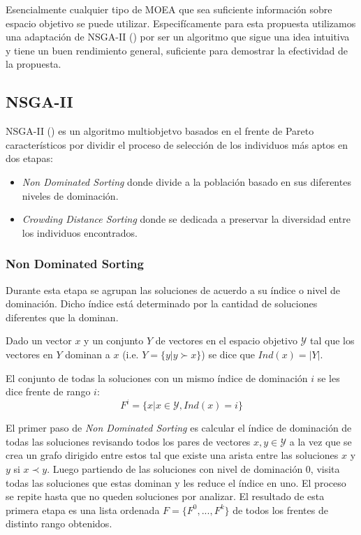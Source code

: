 Esencialmente cualquier tipo de MOEA que sea suficiente informaci\'on sobre espacio objetivo se puede utilizar. Especif\'icamente para esta propuesta utilizamos una adaptaci\'on de NSGA-II (\cite{deb2002fast}) por ser un algoritmo que sigue una idea intuitiva y tiene un buen rendimiento general, suficiente para demostrar la efectividad de la propuesta.

\subsection{NSGA-II}
NSGA-II (\cite{deb2002fast}) es un algoritmo multiobjetvo basados en el frente de Pareto caracter\'isticos por dividir el proceso de selecci\'on de los individuos m\'as aptos en dos etapas:
\begin{itemize}
    \item \textit{Non Dominated Sorting} donde divide a la poblaci\'on basado en sus diferentes niveles de dominaci\'on.
    \item \textit{Crowding Distance Sorting} donde se dedicada a preservar la diversidad entre los individuos encontrados. 
\end{itemize}


\subsubsection{Non Dominated Sorting}
Durante esta etapa se agrupan las soluciones de acuerdo a su \'indice o nivel de dominaci\'on. Dicho \'indice est\'a  determinado por la cantidad de soluciones diferentes que la dominan.

\begin{definition}
    \label{proposal:def:domination_index}
    Dado un vector $x$ y un conjunto $Y$ de vectores en el espacio objetivo $\mathcal{Y}$ tal que los vectores en $Y$ dominan a $x$ (i.e. $Y = \{y | y \succ x\}$) se dice que $Ind(x) = |Y|$.
\end{definition}

\begin{definition}
    \label{proposal:def:rank_front}
    El conjunto de todas la soluciones con un mismo \'indice de dominaci\'on $i$ se les dice frente de rango $i$:
    \begin{equation*}
         F^i = \{x | x \in \mathcal{Y}, Ind(x) = i\}
    \end{equation*}
\end{definition}

El primer paso de \textit{Non Dominated Sorting} es calcular el \'indice de dominaci\'on de todas las soluciones revisando todos los pares de vectores $x, y \in \mathcal{Y}$ a la vez que se crea un grafo dirigido entre estos tal que existe una arista entre las soluciones $x$ y $y$ si $x \prec y$. Luego partiendo de las soluciones con nivel de dominaci\'on 0, visita todas las soluciones que estas dominan y les reduce el \'indice en uno. El proceso se repite hasta que no queden soluciones por analizar.
El resultado de esta primera etapa es una lista ordenada  $F = \{F^0, ..., F^k\}$ de todos los frentes de distinto rango obtenidos. 

